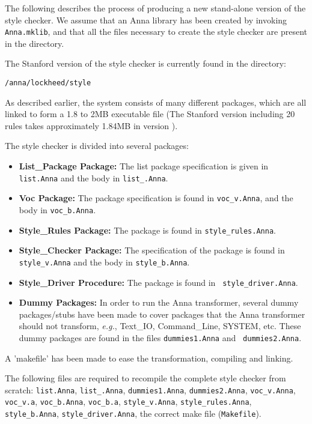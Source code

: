 The following describes the process of producing a new stand-alone version of
 the style checker. We assume that an Anna library has been created by 
invoking {\tt Anna.mklib}, and that all the files necessary to create the style
checker are present in the directory.

The Stanford version of the style checker is currently found in the directory:
\begin{center}
\tt /anna/lockheed/style
\end{center}

As described earlier, the system consists of many different packages, which
are all linked to form a 1.8 to 2MB executable file (The Stanford
version including 20 rules takes approximately 1.84MB in version \version).

The style checker is divided into several packages:

\begin{itemize}
\item {\bf List\_Package Package:} The list package specification is given in {\tt list.Anna} 
and the body in {\tt list\_.Anna}.

\item {\bf Voc Package:} The package specification is found in
{\tt voc\_v.Anna}, and the body in {\tt voc\_b.Anna}. 

\item {\bf Style\_Rules Package:} The package is found in {\tt style\_rules.Anna}.

\item {\bf Style\_Checker Package:} The specification of the package is found
in {\tt style\_v.Anna} and the body in {\tt style\_b.Anna}.

\item {\bf Style\_Driver Procedure:} The package is found in {\tt
style\_driver.Anna}.

\item {\bf Dummy Packages:} In order to run the Anna transformer,
several dummy packages/stubs have been made to cover packages that the 
Anna transformer should not transform, {\em e.g.}, Text\_IO, Command\_Line, SYSTEM, etc.
These dummy packages are found in the files {\tt dummies1.Anna} and {\tt
dummies2.Anna}.
\end{itemize}

A 'makefile' has been made to ease the transformation, compiling and linking.

The following files are required to recompile the complete style checker from
scratch:
{\tt list.Anna},
{\tt list\_.Anna},
{\tt dummies1.Anna},
{\tt dummies2.Anna},
{\tt voc\_v.Anna},
{\tt voc\_v.a},
{\tt voc\_b.Anna},
{\tt voc\_b.a},
{\tt style\_v.Anna},
{\tt style\_rules.Anna},
{\tt style\_b.Anna},
{\tt style\_driver.Anna},
the correct make file ({\tt Makefile}).

